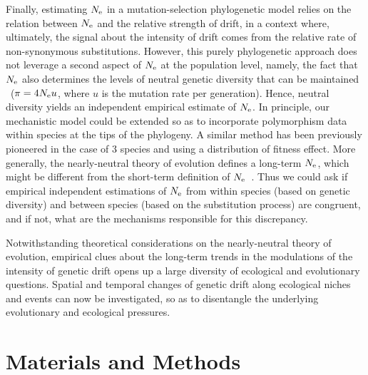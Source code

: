 Finally, estimating $N_{\text{e}}$ in a mutation-selection phylogenetic model relies on the relation between $N_{\text{e}}$ and the relative strength of drift, in a context where, ultimately, the signal about the intensity of drift comes from the relative rate of \gls{non-synonymous} \glspl{substitution}.
However, this purely phylogenetic approach does not leverage a second aspect of $N_{\text{e}}$ at the population level, namely, the fact that $N_{\text{e}}$ also determines the levels of \gls{neutral} genetic diversity that can be maintained ~($\pi=4N_{\text{e}} u$, where $u$ is the mutation rate per generation).
Hence, \gls{neutral} diversity yields an independent empirical estimate of $N_{\text{e}}$.
In principle, our mechanistic model could be extended so as to incorporate polymorphism data within species at the tips of the phylogeny.
A similar method has been previously pioneered in the case of 3 species and using a distribution of fitness effect\citep{Wilson2011}.
More generally, the \gls{nearly-neutral} theory of evolution defines a long-term $N_{\text{e}}$, which might be different from the short-term definition of $N_{\text{e}}$~\citep{Platt2018}.
Thus we could ask if empirical independent estimations of $N_{\text{e}}$ from within species (based on genetic diversity) and between species (based on the \gls{substitution} process) are congruent, and if not, what are the mechanisms responsible for this discrepancy.

Notwithstanding theoretical considerations on the \gls{nearly-neutral} theory of evolution, empirical clues about the long-term trends in the modulations of the intensity of \gls{genetic drift} opens up a large diversity of ecological and evolutionary questions.
Spatial and temporal changes of \gls{genetic drift} along ecological niches and events can now be investigated, so as to disentangle the underlying evolutionary and ecological pressures.


\section{Materials and Methods}
\label{sec:MatMet}

